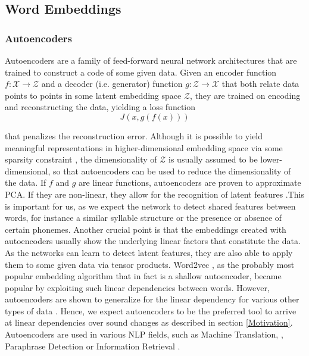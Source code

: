 \documentclass[6pt]{article}
\begin{document}
\subsection{Word Embeddings}
\label{Word Embeddings}
\subsubsection{Autoencoders}

Autoencoders are a family of feed-forward neural network architectures that are trained to construct a code of some given data. Given an encoder function $f: \mathcal{X} \rightarrow \mathcal{Z}$ and a decoder (i.e. generator) function $g: \mathcal{Z} \rightarrow \mathcal{X}$ that both relate data points to points in some latent embedding space $\mathcal{Z}$, they are trained on encoding and reconstructing the data, yielding a loss function
\begin{equation}
J(x,g(f(x)))
\end{equation}
 
that penalizes the reconstruction error. Although it is possible to yield meaningful representations in higher-dimensional embedding space via some sparsity constraint \citep{ng2011sparse}, the dimensionality of $\mathcal{Z}$ is usually assumed to be lower-dimensional, so that autoencoders can be used to reduce the dimensionality of the data. If $f$ and $g$ are linear functions, autoencoders are proven to approximate PCA. If they are non-linear, they allow for the recognition of latent features \citep{hinton2006reducing}.This is important for us, as we expect the network to detect shared features between words, for instance a similar syllable structure or the presence or absence of certain phonemes. Another crucial point is that the embeddings created with autoencoders usually show the underlying linear factors that constitute the data. As the networks can learn to detect latent features, they are also able to apply them to some given data via tensor products. Word2vec \citep{mikolov2013efficient,mikolov2013distributed,goldberg2014word2vec}, as the probably most popular embedding algorithm that in fact is a shallow autoencoder, became popular by exploiting such linear dependencies between words. However, autoencoders are shown to generalize for the linear dependency for various other types of data \citep{radford2015unsupervised,dosovitskiy2015learning}. Hence, we expect autoencoders to be the preferred tool to arrive at linear dependencies over sound changes as described in section \ref{Motivation}.  Autoencoders are used in various NLP fields, such as Machine Translation, \citep{lauly2014autoencoder,zhang2014bilingually}, Paraphrase Detection  \citep{socher2011dynamic} or Information Retrieval \citep{silberer2014learning,le2014distributed}. 
\end{document}
